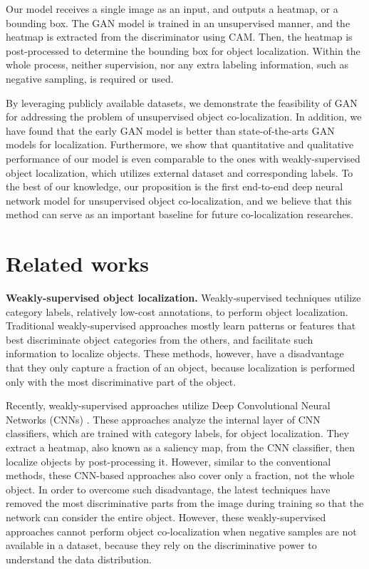 \documentclass[runningheads]{llncs}
\begin{document}
Our model receives a single image as an input, and outputs a heatmap, or a bounding box. The GAN model is trained in an unsupervised manner, and the heatmap is extracted from the discriminator using CAM. Then, the heatmap is post-processed to determine the bounding box for object localization. Within the whole process, neither supervision, nor any extra labeling information, such as negative sampling, is required or used.

By leveraging publicly available datasets, we demonstrate the feasibility of GAN for addressing the problem of unsupervised object co-localization. In addition, we have found that the early GAN model \cite{radford2015unsupervised} is better than state-of-the-arts GAN models \cite{gulrajani2017improved,kodali2017dragan} for localization. Furthermore, we show that quantitative and qualitative performance of our model is even comparable to the ones with weakly-supervised object localization, which utilizes external dataset and corresponding labels. To the best of our knowledge, our proposition is the first end-to-end deep neural network model for unsupervised object co-localization, and we believe that this method can serve as an important baseline for future co-localization researches.


\section{Related works}
\label{sec:relatedworks}

\noindent\textbf{Weakly-supervised object localization.} Weakly-supervised techniques utilize category labels, relatively low-cost annotations, to perform object localization. Traditional weakly-supervised approaches \cite{bilen2014weakly,song2014learning,cinbis2014multi,song2014weakly,li2016weakly,cinbis2017weakly} mostly learn patterns or features that best discriminate object categories from the others, and facilitate such information to localize objects. These methods, however, have a disadvantage that they only capture a fraction of an object, because localization is performed only with the most discriminative part of the object.

Recently, weakly-supervised approaches utilize Deep Convolutional Neural Networks (CNNs) \cite{zhou2016learning,simonyan2013deep,oquab2015object,bilen2016weakly,kantorov2016contextlocnet,selvaraju2017grad}. These approaches analyze the internal layer of CNN classifiers, which are trained with category labels, for object localization. They extract a heatmap, also known as a saliency map, from the CNN classifier, then localize objects by post-processing it. However, similar to the conventional methods, these CNN-based approaches also cover only a fraction, not the whole object. In order to overcome such disadvantage, the latest techniques \cite{kim2017two,singh2017hide,choe2018improved} have removed the most discriminative parts from the image during training so that the network can consider the entire object. However, these weakly-supervised approaches cannot perform object co-localization when negative samples are not available in a dataset, because they rely on the discriminative power to understand the data distribution.
\end{document}
